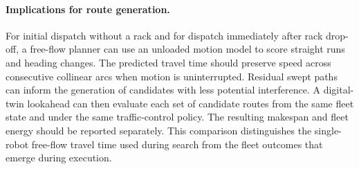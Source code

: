 \documentclass[11pt]{article}
\begin{document}
\paragraph{Implications for route generation.}
For initial dispatch without a rack and for dispatch immediately after rack
drop-off, a free-flow planner can use an unloaded motion model to score
straight runs and heading changes. The predicted travel time should preserve
speed across consecutive collinear arcs when motion is uninterrupted.
Residual swept paths can inform the generation of candidates with less
potential interference. A digital-twin lookahead can then evaluate each set of
candidate routes from the same fleet state and under the same traffic-control
policy. The resulting makespan and fleet energy should be reported separately.
This comparison distinguishes the single-robot free-flow travel time used
during search from the fleet outcomes that emerge during execution.
\end{document}
